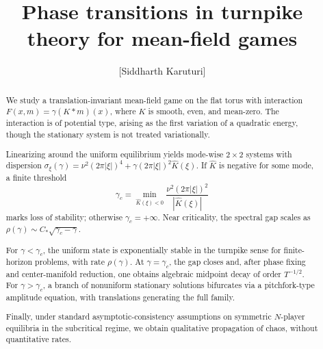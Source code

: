 \documentclass[11pt]{amsart}
\theoremstyle{definition}
\theoremstyle{remark}
\begin{document}

\title[Phase Transitions in Turnpike Theory for MFG]{Phase transitions in turnpike theory for mean-field games}

\author{[Siddharth Karuturi]}
\address{[Illinois Mathematics and Science Academy]}
\date{}


\begin{abstract}
We study a translation-invariant mean-field game on the flat torus with interaction $F(x,m)=\gamma (K*m)(x)$, where $K$ is smooth, even, and mean-zero. The interaction is of potential type, arising as the first variation of a quadratic energy, though the stationary system is not treated variationally.

Linearizing around the uniform equilibrium yields mode-wise $2\times 2$ systems with dispersion $\sigma_\xi(\gamma)=\nu^2(2\pi|\xi|)^4+\gamma(2\pi|\xi|)^2\hat K(\xi)$. If $\hat K$ is negative for some mode, a finite threshold
\[
\gamma_c=\min_{\hat K(\xi)<0}\frac{\nu^2(2\pi|\xi|)^2}{|\hat K(\xi)|}
\]
marks loss of stability; otherwise $\gamma_c=+\infty$. Near criticality, the spectral gap scales as $\rho(\gamma)\sim C_*\sqrt{\gamma_c-\gamma}$.

For $\gamma<\gamma_c$, the uniform state is exponentially stable in the turnpike sense for finite-horizon problems, with rate $\rho(\gamma)$. At $\gamma=\gamma_c$, the gap closes and, after phase fixing and center-manifold reduction, one obtains algebraic midpoint decay of order $T^{-1/2}$. For $\gamma>\gamma_c$, a branch of nonuniform stationary solutions bifurcates via a pitchfork-type amplitude equation, with translations generating the full family.

Finally, under standard asymptotic-consistency assumptions on symmetric $N$-player equilibria in the subcritical regime, we obtain qualitative propagation of chaos, without quantitative rates.
\end{abstract}

\maketitle
\end{document}
